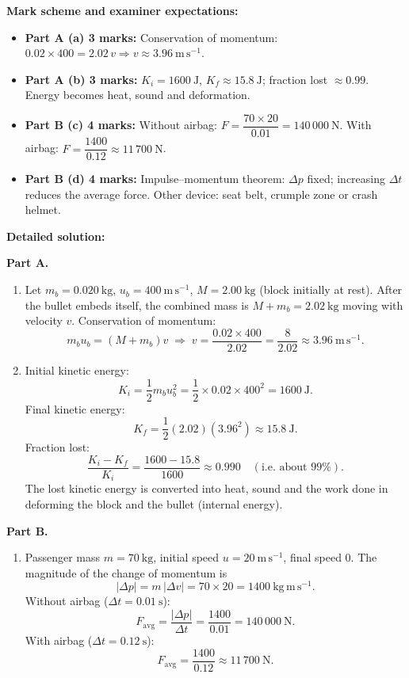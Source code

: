 \documentclass[11pt]{article}
\begin{document}
\begin{corrige}
\textbf{Mark scheme and examiner expectations:}
\begin{itemize}
\item \textbf{Part A (a) 3 marks:} Conservation of momentum: $0.02 \times 400 = 2.02\,v \Rightarrow v \approx 3.96\ \mathrm{m\,s^{-1}}$.
\item \textbf{Part A (b) 3 marks:} $K_i = 1600\ \mathrm{J}$, $K_f \approx 15.8\ \mathrm{J}$; fraction lost $\approx 0.99$. Energy becomes heat, sound and deformation.
\item \textbf{Part B (c) 4 marks:} Without airbag: $F = \dfrac{70 \times 20}{0.01} = 140\,000\ \mathrm{N}$. With airbag: $F = \dfrac{1400}{0.12} \approx 11\,700\ \mathrm{N}$.
\item \textbf{Part B (d) 4 marks:} Impulse–momentum theorem: $\Delta p$ fixed; increasing $\Delta t$ reduces the average force. Other device: seat belt, crumple zone or crash helmet.
\end{itemize}

\textbf{Detailed solution:}

\textbf{Part A.}
\begin{enumerate}
\item Let $m_b = 0.020\ \mathrm{kg}$, $u_b = 400\ \mathrm{m\,s^{-1}}$, $M = 2.00\ \mathrm{kg}$ (block initially at rest). After the bullet embeds itself, the combined mass is $M+m_b = 2.02\ \mathrm{kg}$ moving with velocity $v$. Conservation of momentum:
\[ m_b u_b = (M+m_b)v \;\Rightarrow\; v = \frac{0.02 \times 400}{2.02} = \frac{8}{2.02} \approx 3.96\ \mathrm{m\,s^{-1}}. \]

\item Initial kinetic energy:
\[ K_i = \frac{1}{2}m_b u_b^2 = \frac{1}{2} \times 0.02 \times 400^2 = 1600\ \mathrm{J}. \]
Final kinetic energy:
\[ K_f = \frac{1}{2}(2.02)(3.96^2) \approx 15.8\ \mathrm{J}. \]
Fraction lost:
\[ \frac{K_i - K_f}{K_i} = \frac{1600-15.8}{1600} \approx 0.990 \quad (\text{i.e. about } 99\%). \]
The lost kinetic energy is converted into heat, sound and the work done in deforming the block and the bullet (internal energy).
\end{enumerate}

\textbf{Part B.}
\begin{enumerate}
\item[(c)] Passenger mass $m = 70\ \mathrm{kg}$, initial speed $u = 20\ \mathrm{m\,s^{-1}}$, final speed $0$. The magnitude of the change of momentum is
\[ |\Delta p| = m\,|\Delta v| = 70 \times 20 = 1400\ \mathrm{kg\,m\,s^{-1}}. \]
Without airbag ($\Delta t = 0.01\ \mathrm{s}$):
\[ F_{\mathrm{avg}} = \frac{|\Delta p|}{\Delta t} = \frac{1400}{0.01} = 140\,000\ \mathrm{N}. \]
With airbag ($\Delta t = 0.12\ \mathrm{s}$):
\[ F_{\mathrm{avg}} = \frac{1400}{0.12} \approx 11\,700\ \mathrm{N}. \]


\end{enumerate}
\end{corrige}
\end{document}
